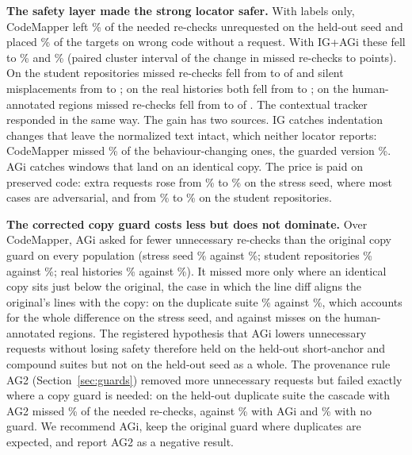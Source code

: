 \textbf{The safety layer made the strong locator safer.} With labels only, CodeMapper left \wiFrCmQMiss\% of the needed re-checks unrequested on the held-out seed and placed \wiFrCmQSilent\% of the targets on wrong code without a request. With IG+AGi these fell to \wiFrCmGiMiss\% and \wiFrCmGiSilent\% (paired cluster interval of the change in missed re-checks \wiFrCmGiVsCmQMissLo{} to \wiFrCmGiVsCmQMissHi{} points). On the student repositories missed re-checks fell from \wiStuCmQMissK{} to \wiStuCmGiMissK{} of \wiStuCmQMissN{} and silent misplacements from \wiStuCmQSilentK{} to \wiStuCmGiSilentK{}; on the real histories both fell from \wiRealCmQMissK{} to \wiRealCmGiMissK{}; on the human-annotated regions missed re-checks fell from \wiHumCmQMissK{} to \wiHumCmGiMissK{} of \wiHumCmQMissN{}. The contextual tracker responded in the same way. The gain has two sources. IG catches indentation changes that leave the normalized text intact, which neither locator reports: CodeMapper missed \wiFrIndCmQMiss\% of the behaviour-changing ones, the guarded version \wiFrIndCmGiMiss\%. AGi catches windows that land on an identical copy. The price is paid on preserved code: extra requests rose from \wiFrCmQFalse\% to \wiFrCmGiFalse\% on the stress seed, where most cases are adversarial, and from \wiStuCmQFalse\% to \wiStuCmGiFalse\% on the student repositories.

\textbf{The corrected copy guard costs less but does not dominate.} Over CodeMapper, AGi asked for fewer unnecessary re-checks than the original copy guard on every population (stress seed \wiFrCmGiFalse\% against \wiFrCmGFalse\%; student repositories \wiStuCmGiFalse\% against \wiStuCmGFalse\%; real histories \wiRealCmGiFalse\% against \wiRealCmGFalse\%). It missed more only where an identical copy sits just below the original, the case in which the line diff aligns the original's lines with the copy: on the duplicate suite \wiFrDupCmGiMiss\% against \wiFrDupCmGMiss\%, which accounts for the whole difference on the stress seed, and \wiHumCmGiMissK{} against \wiHumCmGMissK{} misses on the human-annotated regions. The registered hypothesis that AGi lowers unnecessary requests without losing safety therefore held on the held-out short-anchor and compound suites but not on the held-out seed as a whole. The provenance rule AG2 (Section~\ref{sec:guards}) removed more unnecessary requests but failed exactly where a copy guard is needed: on the held-out duplicate suite the cascade with AG2 missed \wiFrDupCasAGtwoMiss\% of the needed re-checks, against \wiFrDupCasAGiMiss\% with AGi and \wiFrDupDepMiss\% with no guard. We recommend AGi, keep the original guard where duplicates are expected, and report AG2 as a negative result.

